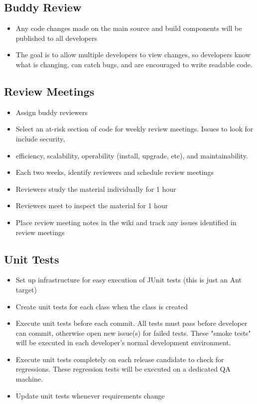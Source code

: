\documentclass[11pt]{article}
\begin{document}
\subsection{Buddy Review}

\begin{itemize}

\item Any code changes made on the main source and build components will be published to all developers
\item The goal is to allow multiple developers to view changes, so developers know what is changing, can catch bugs, and are encouraged to write readable code.
\end{itemize}

\subsection{Review Meetings}

\begin{itemize}

\item Assign buddy reviewers
\item Select an at-risk section of code for weekly review meetings. Issues to look for include security, \item efficiency, scalability, operability (install, upgrade, etc), and maintainability.
\item Each two weeks, identify reviewers and schedule review meetings
\item Reviewers study the material individually for 1 hour
\item Reviewers meet to inspect the material for 1 hour
\item Place review meeting notes in the wiki and track any issues identified in review meetings
\end{itemize}

\subsection{Unit Tests}

\begin{itemize}
\item Set up infrastructure for easy execution of JUnit tests (this is just an Ant target)
\item Create unit tests for each class when the class is created
\item Execute unit tests before each commit. All tests must pass before developer can commit, otherwise open new issue(s) for failed tests. These "smoke tests" will be executed in each developer's normal development environment.
\item Execute unit tests completely on each release candidate to check for regressions. These regression tests will be executed on a dedicated QA machine.
\item Update unit tests whenever requirements change
\end{itemize}
\end{document}

